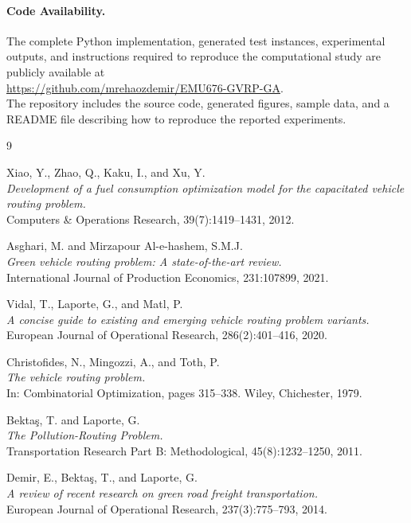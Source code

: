 \documentclass [a4paper, 11pt, titlepage] {article}
\begin{document}
\paragraph{Code Availability.} The complete Python implementation, generated test instances, experimental outputs, and instructions required to reproduce the computational study are publicly available at \\
\url{https://github.com/mrehaozdemir/EMU676-GVRP-GA}. \\
The repository includes the source code, generated figures, sample data, and a README file describing how to reproduce the reported experiments.

\clearpage
\newpage
\label{litt}
\begin{thebibliography}{9}

Xiao, Y., Zhao, Q., Kaku, I., and Xu, Y. \\
\emph{Development of a fuel consumption optimization model for the capacitated vehicle routing problem.} \\
Computers \& Operations Research, 39(7):1419--1431, 2012.

Asghari, M. and Mirzapour Al-e-hashem, S.M.J. \\
\emph{Green vehicle routing problem: A state-of-the-art review.} \\
International Journal of Production Economics, 231:107899, 2021.

Vidal, T., Laporte, G., and Matl, P. \\
\emph{A concise guide to existing and emerging vehicle routing problem variants.} \\
European Journal of Operational Research, 286(2):401--416, 2020.

Christofides, N., Mingozzi, A., and Toth, P. \\
\emph{The vehicle routing problem.} \\
In: Combinatorial Optimization, pages 315--338. Wiley, Chichester, 1979.

Bektaş, T. and Laporte, G. \\
\emph{The Pollution-Routing Problem.} \\
Transportation Research Part B: Methodological, 45(8):1232--1250, 2011.

Demir, E., Bektaş, T., and Laporte, G. \\
\emph{A review of recent research on green road freight transportation.} \\
European Journal of Operational Research, 237(3):775--793, 2014.


\end{thebibliography}
\end{document}
